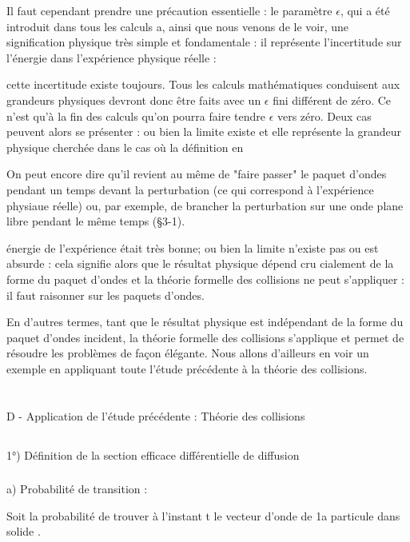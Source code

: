Il faut cependant prendre une précaution essentielle : le
paramètre $\epsilon$, qui a été introduit dans tous les calculs a, ainsi que nous
venons de le voir, une signification physique très simple et fondamentale :
il représente l'incertitude sur l'énergie dans l'expérience physique réelle :

cette incertitude existe toujours. Tous les calculs mathématiques conduisent
aux grandeurs physiques devront donc être faits avec un $\epsilon$ fini différent de
zéro. Ce n'est qu'à la fin des calculs qu'on pourra faire tendre $\epsilon$ vers zéro.
Deux cas peuvent alors se présenter : ou bien la limite existe et elle
représente la grandeur physique cherchée dans le cas où la définition en

 On peut encore dire qu'il revient au même de "faire passer" le paquet
d'ondes pendant un temps  devant la perturbation (ce qui correspond
à l'expérience physiaue réelle) ou, par exemple, de brancher la perturbation sur
une onde plane libre pendant le même temps (\S 3-1).

 

énergie de l'expérience était très bonne; ou bien la limite n'existe pas
ou est absurde : cela signifie alors que le résultat physique dépend cru
cialement de la forme du paquet d'ondes et la théorie formelle des collisions
ne peut s'appliquer : il faut raisonner sur les paquets d'ondes.

En d'autres termes, tant que le résultat physique est indépendant de la
forme du paquet d'ondes incident, la théorie formelle des collisions
s'applique et permet de résoudre les problèmes de façon élégante. Nous
allons d'ailleurs en voir un exemple en appliquant toute l'étude précédente à la
théorie des collisions.

\section{}%
D - Application de l'étude précédente : Théorie des collisions
\subsection{}%
1°) Définition de la section efficace différentielle de diffusion

\subsubsection{}%
a) Probabilité de transition :

Soit  la probabilité de trouver à l'instant t le
vecteur d'onde de 1a particule dans  solide .

